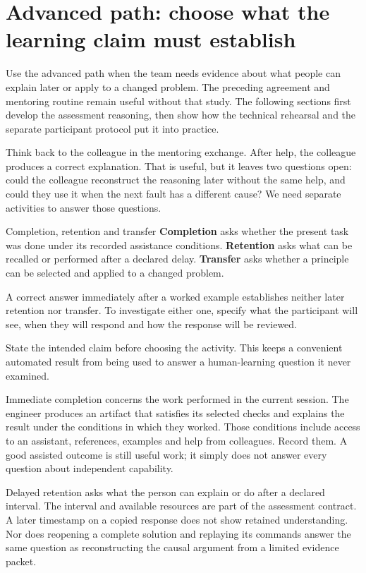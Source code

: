 \section{Advanced path: choose what the learning claim must establish}\label{sec:ch13-claims}

Use the advanced path when the team needs evidence about what people can explain later or apply to a changed problem. The preceding agreement and mentoring routine remain useful without that study. The following sections first develop the assessment reasoning, then show how the technical rehearsal and the separate participant protocol put it into practice.

Think back to the colleague in the mentoring exchange. After help, the colleague produces a correct explanation. That is useful, but it leaves two questions open: could the colleague reconstruct the reasoning later without the same help, and could they use it when the next fault has a different cause? We need separate activities to answer those questions.

\begin{conceptbox}{Completion, retention and transfer}
\textbf{Completion} asks whether the present task was done under its recorded assistance conditions. \textbf{Retention} asks what can be recalled or performed after a declared delay. \textbf{Transfer} asks whether a principle can be selected and applied to a changed problem.

A correct answer immediately after a worked example establishes neither later retention nor transfer. To investigate either one, specify what the participant will see, when they will respond and how the response will be reviewed.
\end{conceptbox}

State the intended claim before choosing the activity. This keeps a convenient automated result from being used to answer a human-learning question it never examined.

Immediate completion concerns the work performed in the current session. The engineer produces an artifact that satisfies its selected checks and explains the result under the conditions in which they worked. Those conditions include access to an assistant, references, examples and help from colleagues. Record them. A good assisted outcome is still useful work; it simply does not answer every question about independent capability.

Delayed retention asks what the person can explain or do after a declared interval. The interval and available resources are part of the assessment contract. A later timestamp on a copied response does not show retained understanding. Nor does reopening a complete solution and replaying its commands answer the same question as reconstructing the causal argument from a limited evidence packet.

